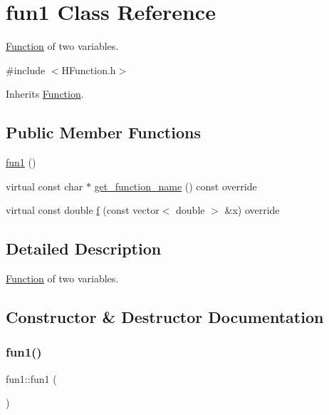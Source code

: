 \hypertarget{classfun1}{}\section{fun1 Class Reference}
\label{classfun1}


\hyperlink{class_function}{Function} of two variables.  




{\ttfamily \#include $<$H\+Function.\+h$>$}



Inherits \hyperlink{class_function}{Function}.

\subsection*{Public Member Functions}
\begin{DoxyCompactItemize}
\item 
\hyperlink{classfun1_a86a79c6b6b5df6c5183f230ef871010c}{fun1} ()
\item 
virtual const char $\ast$ \hyperlink{classfun1_ad511ad7550fdfed650b5ded751f0f1e2}{get\+\_\+function\+\_\+name} () const override
\item 
virtual const double \hyperlink{classfun1_afc5f6c5f842b59be98115c23864ccce5}{f} (const vector$<$ double $>$ \&x) override
\end{DoxyCompactItemize}


\subsection{Detailed Description}
\hyperlink{class_function}{Function} of two variables. 

\subsection{Constructor \& Destructor Documentation}
\mbox{\label{classfun1_a86a79c6b6b5df6c5183f230ef871010c}} 
\subsubsection{\texorpdfstring{fun1()}{fun1()}}
{\footnotesize\ttfamily fun1\+::fun1 (\begin{DoxyParamCaption}{ }\end{DoxyParamCaption})}



